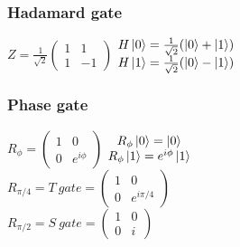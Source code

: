 \documentclass[11.5pt, paper=a4]{article}
\theoremstyle{definition}
\numberwithin{theorem}{section}
\begin{document}
\subsubsection{Hadamard gate}
    $Z = \frac{1}{\sqrt{2}}\begin{pmatrix}
    1 & 1\\
    1 & -1
    \end{pmatrix}$ $\begin{matrix}
    H\ket{0} = \frac{1}{\sqrt{2}}(\ket{0} + \ket{1})\\
    H\ket{1} = \frac{1}{\sqrt{2}}(\ket{0} - \ket{1})\\
    \end{matrix}$
\subsubsection{Phase gate}
    $R_{\phi} = \begin{pmatrix}
    1 & 0\\
    0 & e^{i\phi}
    \end{pmatrix}$ $\begin{matrix}
    R_{\phi}\ket{0} = \ket{0} \\
    R_{\phi}\ket{1} = e^{i\phi}\ket{1}
    \end{matrix}$ \\
    $R_{\pi/4} = T\ gate = \begin{pmatrix}
    1 & 0\\
    0 & e^{i\pi/4}
    \end{pmatrix}$ \\
    $R_{\pi/2} = S\ gate = \begin{pmatrix}
    1 & 0\\
    0 & i
    \end{pmatrix}$\\
\end{document}
